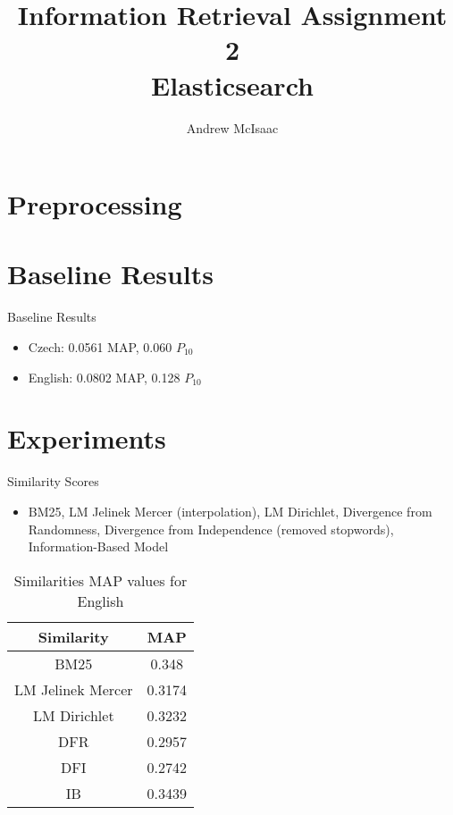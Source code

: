 \documentclass{beamer}
\title[Assignment 1]{Information Retrieval Assignment 2\\Elasticsearch}
\author{Andrew McIsaac}
\begin{document}
\begin{frame}
  \titlepage
\end{frame}

\section{Preprocessing}

\section{Baseline Results}

\begin{frame}{Baseline Results}

\begin{itemize}
	\item Czech: 0.0561 MAP, 0.060 $P_{10}$
	\item English: 0.0802 MAP, 0.128 $P_{10}$
\end{itemize}

\end{frame}

\section{Experiments}

\begin{frame}{Similarity Scores}
\begin{itemize}
  \item BM25, LM Jelinek Mercer (interpolation), LM Dirichlet, Divergence from Randomness,
	  Divergence from Independence (removed stopwords), Information-Based Model
\end{itemize}

\begin{table}[htpb]
    \centering
    \caption{Similarities MAP values for English}
    \label{tab:similarities}
    \begin{tabular}{c|c}
    Similarity & MAP \\
    \hline
    BM25 & 0.348 \\
    LM Jelinek Mercer & 0.3174 \\
    LM Dirichlet & 0.3232 \\
    DFR & 0.2957 \\
    DFI & 0.2742 \\
    IB & 0.3439
    \end{tabular}
\end{table}

\end{frame}
\end{document}
